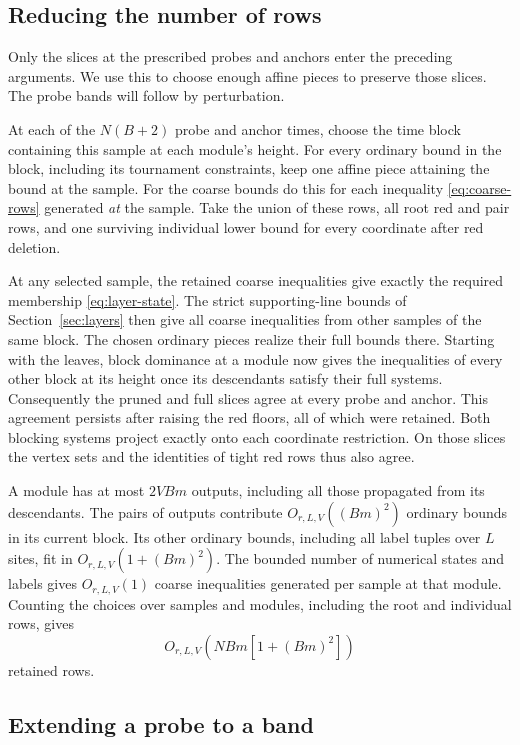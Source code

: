 \subsection{Reducing the number of rows}

Only the slices at the prescribed probes and anchors enter the preceding arguments.
We use this to choose enough affine pieces to preserve those slices. The probe
bands will follow by perturbation.

At each of the \(N(B+2)\) probe and anchor times, choose the time block containing
this sample at each module's height. For every ordinary bound in the block,
including its tournament constraints, keep one affine piece attaining the bound
at the sample. For the coarse bounds do this for each inequality
\eqref{eq:coarse-rows} generated \emph{at} the sample. Take the union of these
rows, all root red and pair rows, and one surviving individual lower bound for
every coordinate after red deletion.

At any selected sample, the retained coarse inequalities give exactly the required
membership \eqref{eq:layer-state}. The strict supporting-line bounds of
Section~\ref{sec:layers} then give all coarse inequalities from other samples of
the same block. The chosen ordinary pieces realize their full bounds there.
Starting with the leaves, block dominance at a module now gives the inequalities
of every other block at its height once its descendants satisfy their full systems.
Consequently the pruned and full slices agree at every probe and anchor. This
agreement persists after raising the red floors, all of which were retained. Both
blocking systems project exactly onto each coordinate restriction. On those slices
the vertex sets and the identities of tight red rows thus also agree.

A module has at most \(2VBm\) outputs, including all those propagated from its
descendants. The pairs of outputs contribute \(O_{r,L,V}((Bm)^2)\) ordinary bounds
in its current block. Its other ordinary bounds, including all label tuples over
\(L\) sites, fit in \(O_{r,L,V}(1+(Bm)^2)\). The bounded number of numerical states
and labels gives \(O_{r,L,V}(1)\) coarse inequalities generated per sample at that
module. Counting the choices over samples and modules, including the root and
individual rows, gives
\[
                      O_{r,L,V}\!\left(NBm[1+(Bm)^2]\right)
\]
retained rows.

\subsection{Extending a probe to a band}

